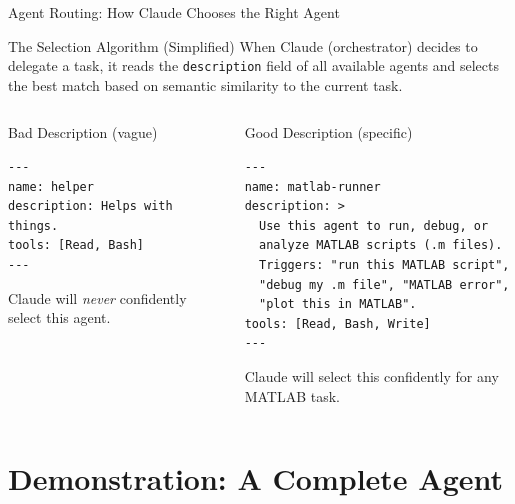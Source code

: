 \documentclass[aspectratio=169,xcolor=dvipsnames]{beamer}
\begin{document}
\begin{frame}[fragile]{Agent Routing: How Claude Chooses the Right Agent}
    \begin{block}{The Selection Algorithm (Simplified)}
        When Claude (orchestrator) decides to delegate a task, it reads the \texttt{description} field of all available agents and selects the best match based on semantic similarity to the current task.
    \end{block}

    \begin{columns}
        \begin{alertblock}{Bad Description (vague)}
                        \begin{lstlisting}[style=MarkdownStyle]
---
name: helper
description: Helps with things.
tools: [Read, Bash]
---
            \end{lstlisting}
            Claude will \emph{never} confidently select this agent.
        \end{alertblock}

        \begin{exampleblock}{Good Description (specific)}
                        \begin{lstlisting}[style=MarkdownStyle]
---
name: matlab-runner
description: >
  Use this agent to run, debug, or
  analyze MATLAB scripts (.m files).
  Triggers: "run this MATLAB script",
  "debug my .m file", "MATLAB error",
  "plot this in MATLAB".
tools: [Read, Bash, Write]
---
            \end{lstlisting}
            Claude will select this confidently for any MATLAB task.
        \end{exampleblock}
    \end{columns}
\end{frame}

\section{Demonstration: A Complete Agent}
\end{document}
